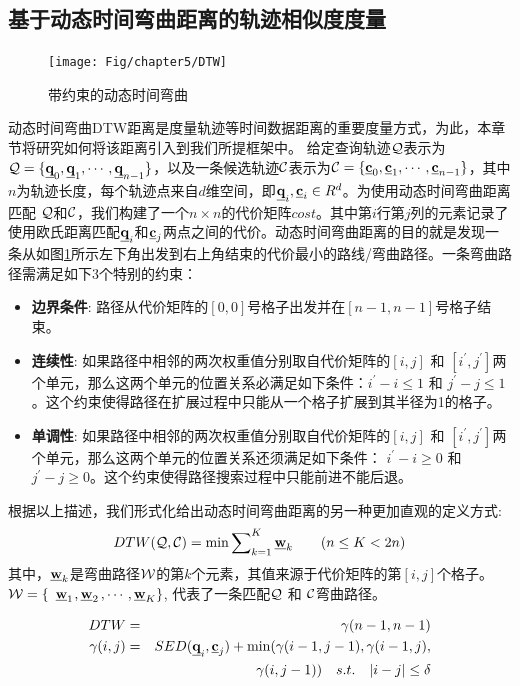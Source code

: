\subsection{基于动态时间弯曲距离的轨迹相似度度量}\label{sec-c5-DTW}
\begin{figure}[t]
	\centering
	\texttt{[image: Fig/chapter5/DTW]}
	\caption{带约束的动态时间弯曲}
	\label{fig:DTW}
\end{figure}
动态时间弯曲DTW距离是度量轨迹等时间数据距离的重要度量方式\cite{XXD}，为此，本章节将研究如何将该距离引入到我们所提框架中。
给定查询轨迹$\cal Q$表示为${\cal Q}=\{\emph{{\textbf{q}}}_{0}, \emph{{\textbf{q}}}_{1}, \cdots, \emph{{\textbf{q}}}_{n-1}\}$，以及一条候选轨迹$\cal C$表示为${\cal C}=\{\emph{{\textbf{c}}}_{0}, \emph{{\textbf{c}}}_{1}, \cdots, \emph{{\textbf{c}}}_{n-1}\}$，其中$n$为轨迹长度，每个轨迹点来自$d$维空间，即$\emph{{\textbf{q}}}_{i},\emph{{\textbf{c}}}_{i} \in R^{d}$。为使用动态时间弯曲距离匹配 $\cal Q$和$\cal C$，我们构建了一个$n\times n$的代价矩阵$cost$。其中第$i$行第$j$列的元素记录了使用欧氏距离匹配$\emph{{\textbf{q}}}_{i}$和$\emph{{\textbf{c}}}_{j}$两点之间的代价。动态时间弯曲距离的目的就是发现一条从如图\ref{fig:DTW}所示左下角出发到右上角结束的代价最小的路线/弯曲路径。一条弯曲路径需满足如下3个特别的约束：
\begin{itemize}
	\item \textbf{边界条件}: 路径从代价矩阵的$[0,0]$号格子出发并在$[n-1,n-1]$号格子结束。
	
	\item \textbf{连续性}: 如果路径中相邻的两次权重值分别取自代价矩阵的$[i,j]$ 和 $[i^{'},j^{'}]$两个单元，那么这两个单元的位置关系必满足如下条件：$i^{'}-i\le 1$ 和 $j^{'} - j \le 1$。这个约束使得路径在扩展过程中只能从一个格子扩展到其半径为1的格子。
	\item \textbf{单调性}: 如果路径中相邻的两次权重值分别取自代价矩阵的$[i,j]$ 和 $[i^{'},j^{'}]$两个单元，那么这两个单元的位置关系还须满足如下条件： $i^{'}-i\ge 0$ 和 $j^{'} - j \ge 0$。这个约束使得路径搜索过程中只能前进不能后退。
\end{itemize}
根据以上描述，我们形式化给出动态时间弯曲距离的另一种更加直观的定义方式:
\begin{eqnarray}\label{eq:dtwDef}
DTW({\cal Q}, {\cal C})= \min{\sum\nolimits_{k=1}^{K}\emph{{\textbf{w}}}_{k}} \qquad {(n\le K < 2n)}
\end{eqnarray}
其中，$\emph{{\textbf{w}}}_{k}$是弯曲路径$\cal W$的第$k$个元素，其值来源于代价矩阵的第$[i,j]$个格子。
$\cal{W}=\{$ $\emph{{\textbf{w}}}_{1}$$,\emph{{\textbf{w}}}_{2}$$,\cdots,\emph{{\textbf{w}}}_{K}\}$, 代表了一条匹配$\cal{Q}$ 和 $\cal{C}$弯曲路径。

\begin{eqnarray}\label{eq:dtwdef}
DTW&=&\gamma(n-1,n-1) \\ \nonumber
\gamma(i,j)&=&SED(\emph{{\textbf{q}}}_{i}, \emph{{\textbf{c}}}_{j}) + \min(\gamma(i-1,j-1), \gamma(i-1,j), \nonumber \\
&&\gamma(i,j-1))  \quad s.t.  \quad |i-j| \le \delta
\end{eqnarray}

